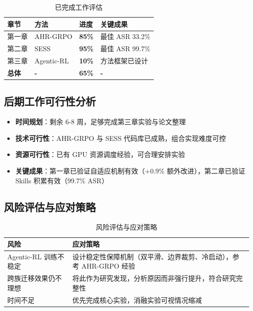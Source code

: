 \documentclass[12pt,a4paper]{article}
\newcommand{\highlight}[1]{\textcolor{primaryblue}{\textbf{#1}}}
\newcommand{\success}[1]{\textcolor{successgreen}{#1}}
\begin{document}
\begin{table}[H]
    \centering
    \begin{tabular}{@{}l l l l@{}}
        \toprule
        \rowcolor{tableheader}
        \textbf{章节} & \textbf{方法} & \textbf{进度} & \textbf{关键成果} \\
        \midrule
        第一章 & AHR-GRPO & \highlight{85\%} & \success{最佳 ASR 33.2\%} \\
        第二章 & SESS & \highlight{95\%} & \success{最佳 ASR 99.7\%} \\
        第三章 & Agentic-RL & \highlight{10\%} & 方法框架已设计 \\
        \rowcolor{lightestblue}
        \textbf{总体} & \textbf{-} & \textbf{\highlight{65\%}} & \textbf{-} \\
        \bottomrule
    \end{tabular}
    \caption{已完成工作评估}
    \label{tab:completion}
\end{table}

\subsection{后期工作可行性分析}

\begin{itemize}
    \item \highlight{时间规划}：剩余 6-8 周，足够完成第三章实验与论文整理
    \item \highlight{技术可行性}：AHR-GRPO 与 SESS 代码库已成熟，组合实现难度可控
    \item \highlight{资源可行性}：已有 GPU 资源调度经验，可合理安排实验
    \item \highlight{关键成果}：第一章已验证自适应机制有效（+0.9\% 额外改进），第二章已验证 Skills 积累有效（99.7\% ASR）
\end{itemize}

\subsection{风险评估与应对策略}

\begin{table}[H]
    \centering
    \begin{tabular}{@{}p{} p{}@{}}
        \toprule
        \rowcolor{tableheader}
        \textbf{风险} & \textbf{应对策略} \\
        \midrule
        Agentic-RL 训练不稳定 & 设计稳定性保障机制（双平滑、边界裁剪、冷启动），参考 AHR-GRPO 经验 \\
        跨族迁移效果仍不理想 & 将此作为研究发现，分析原因而非强行提升，符合研究完整性 \\
        时间不足 & 优先完成核心实验，消融实验可视情况缩减 \\
        \bottomrule
    \end{tabular}
    \caption{风险评估与应对策略}
    \label{tab:risk}
\end{table}
\end{document}
